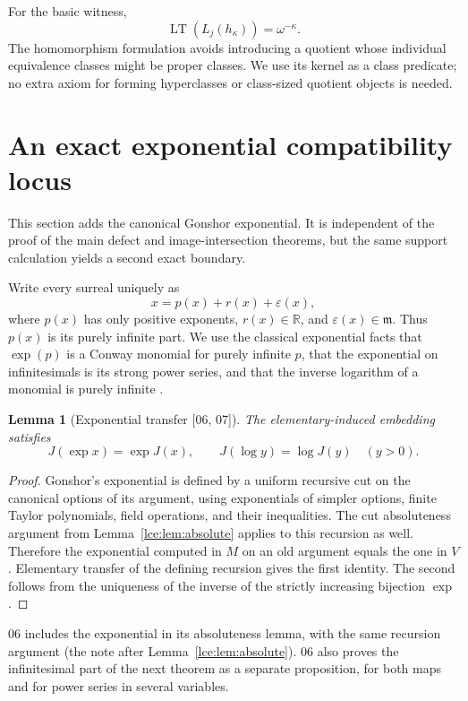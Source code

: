 \documentclass[11pt,letterpaper]{article}
\numberwithin{equation}{section}
\newtheorem{lemma}[theorem]{Lemma}
\theoremstyle{definition}
\theoremstyle{remark}
\newcommand{\R}{\mathbb R}
\newcommand{\LT}{\operatorname{LT}}
\newcommand{\eps}{\varepsilon}
\newcommand{\infideal}{\mathfrak m}
\newcommand{\leref}[1]{Lemma~\ref{#1}}
\newcommand{\src}[1]{\textup{\textsf{\small[#1]}}}%
\begin{document}
For the basic witness,
\[
 \LT(L_j(h_\kappa))=\omega^{-\kappa}.
\]
The homomorphism formulation avoids introducing a quotient whose
individual equivalence classes might be proper classes. We use its
kernel as a class predicate; no extra axiom for forming hyperclasses or
class-sized quotient objects is needed.

\section{An exact exponential compatibility locus}\label{lce:sec:exponential}
This section adds the canonical Gonshor exponential. It is independent of
the proof of the main defect and image-intersection theorems, but the same
support calculation yields a second exact boundary.

Write every surreal uniquely as
\[
 x=p(x)+r(x)+\eps(x),
\]
where $p(x)$ has only positive exponents, $r(x)\in\R$, and
$\eps(x)\in\infideal$. Thus $p(x)$ is its purely infinite part.
We use the classical exponential facts that $\exp(p)$ is a Conway monomial
for purely infinite $p$, that the exponential on infinitesimals is its
strong power series, and that the inverse logarithm of a monomial is
purely infinite \cite[Chapter~10]{Gonshor}\cite[Section~5]{vdDE}.

\begin{lemma}[Exponential transfer \src{06, 07}]\label{lce:lem:exptransfer}
The elementary-induced embedding satisfies
\[
 J(\exp x)=\exp J(x),\qquad
 J(\log y)=\log J(y)\quad(y>0).
\]
\end{lemma}
\begin{proof}
Gonshor's exponential is defined by a uniform recursive cut on the
canonical options of its argument, using exponentials of simpler options,
finite Taylor polynomials, field operations, and their inequalities.
The cut absoluteness argument from \leref{lce:lem:absolute} applies to this
recursion as well. Therefore the exponential computed in $M$ on an old
argument equals the one in $V$. Elementary transfer of the defining
recursion gives the first identity. The second follows from the uniqueness
of the inverse of the strictly increasing bijection $\exp$.
\end{proof}
06 includes the exponential in its absoluteness lemma, with the same
recursion argument (the note after \leref{lce:lem:absolute}). 06 also
proves the infinitesimal part of the next theorem as a separate
proposition, for both maps and for power series in several variables.
\end{document}
